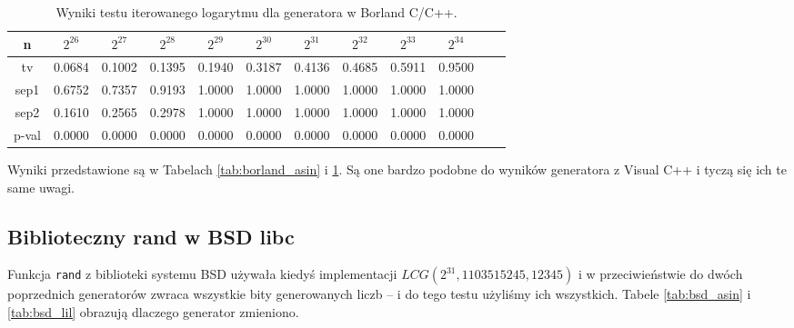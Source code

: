 \documentclass[a4paper,11pt,twoside]{book}
\theoremstyle{definition}
\begin{document}
\begin{table}[ht!]
\centering
 \caption{Wyniki testu iterowanego logarytmu dla generatora w Borland C/C++.}
 \label{tab:borland_lil}
\begin{tabular} {||c|c|c|c|c|c|c|c|c|c|c|c||}  
 \hline 
     n &  $2^{26}$ &  $2^{27}$ &  $2^{28}$ &  $2^{29}$ &  $2^{30}$ &  $2^{31}$ &  $2^{32}$ &  $2^{33}$ &  $2^{34}$\\ \hline
     tv &  0.0684 &  0.1002 &  0.1395 &  0.1940 &  0.3187 &  0.4136 &  0.4685 &  0.5911 &  0.9500\\ \hline
   sep1 &  0.6752 &  0.7357 &  0.9193 &  1.0000 &  1.0000 &  1.0000 &  1.0000 &  1.0000 &  1.0000\\ \hline
   sep2 &  0.1610 &  0.2565 &  0.2978 &  1.0000 &  1.0000 &  1.0000 &  1.0000 &  1.0000 &  1.0000\\ \hline
  p-val &  0.0000 &  0.0000 &  0.0000 &  0.0000 &  0.0000 &  0.0000 &  0.0000 &  0.0000 &  0.0000\\ \hline
\end{tabular}  
\end{table}
Wyniki przedstawione są w Tabelach \ref{tab:borland_asin} i \ref{tab:borland_lil}. Są one bardzo podobne do wyników generatora z Visual C++ i tyczą się ich te same uwagi.

\FloatBarrier
\subsection{Biblioteczny rand w BSD libc}
Funkcja \texttt{rand} z biblioteki systemu BSD używała kiedyś implementacji $LCG(2^{31}, 1103515245, 12345)$ i w przeciwieństwie do dwóch poprzednich generatorów zwraca wszystkie bity generowanych liczb -- i do tego testu użyliśmy ich wszystkich. Tabele \ref{tab:bsd_asin} i \ref{tab:bsd_lil} obrazują dlaczego generator zmieniono.
\end{document}
